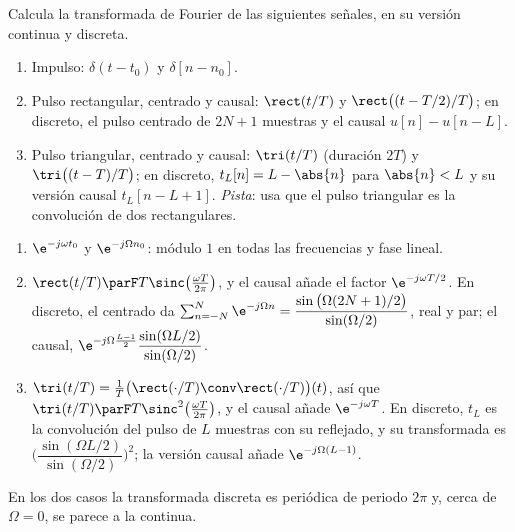 \documentclass[11pt,a4paper]{scrartcl}
\begin{document}
\begin{ejercicio}
  Calcula la transformada de Fourier de las siguientes señales, en su versión continua y discreta.
  \begin{enumerate}[label=\alph*)]
    \item Impulso: $\delta(t-t_0)$ y $\delta[n-n_0]$.
    \item Pulso rectangular, centrado y causal: $\rect(t/T)$ y $\rect\big((t-T/2)/T\big)$; en discreto, el pulso centrado de $2N+1$ muestras y el causal $u[n]-u[n-L]$.
    \item Pulso triangular, centrado y causal: $\tri(t/T)$ (duración $2T$) y $\tri\big((t-T)/T\big)$; en discreto, $t_L[n]=L-\abs{n}$ para $\abs{n}<L$ y su versión causal $t_L[n-L+1]$. \emph{Pista}: usa que el pulso triangular es la convolución de dos rectangulares.
  \end{enumerate}
\end{ejercicio}
\begin{solucion}
  \begin{enumerate}[label=\alph*)]
    \item $\e^{-j\omega t_0}$ y $\e^{-j\Omega n_0}$: módulo $1$ en todas las frecuencias y fase lineal.
    \item $\rect(t/T)\parF T\sinc\big(\tfrac{\omega T}{2\pi}\big)$, y el causal añade el factor $\e^{-j\omega T/2}$. En discreto, el centrado da $\sum_{n=-N}^{N}\e^{-j\Omega n}=\dfrac{\sin\big(\Omega(2N+1)/2\big)}{\sin(\Omega/2)}$, real y par; el causal, $\e^{-j\Omega\frac{L-1}{2}}\dfrac{\sin(\Omega L/2)}{\sin(\Omega/2)}$.
    \item $\tri(t/T)=\frac1T\big(\rect(\cdot/T)\conv\rect(\cdot/T)\big)(t)$, así que $\tri(t/T)\parF T\sinc^2\big(\tfrac{\omega T}{2\pi}\big)$, y el causal añade $\e^{-j\omega T}$. En discreto, $t_L$ es la convolución del pulso de $L$ muestras con su reflejado, y su transformada es $\Big(\dfrac{\sin(\Omega L/2)}{\sin(\Omega/2)}\Big)^2$; la versión causal añade $\e^{-j\Omega(L-1)}$.
  \end{enumerate}
  En los dos casos la transformada discreta es periódica de periodo $2\pi$ y, cerca de $\Omega=0$, se parece a la continua.
\end{solucion}
\end{document}
